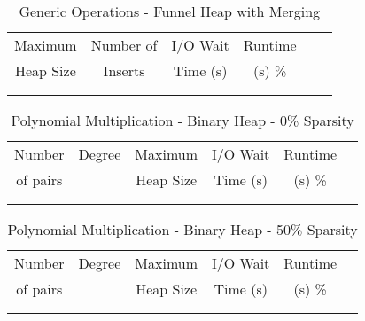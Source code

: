 \documentclass[11pt, one-sided]{amsart}
\begin{document}
\begin{table}[htbp]
   \centering
      \caption{Generic Operations - Funnel Heap with Merging}
   \begin{tabular}{|c|c|c|c|c|c|}
   	\hline
		 Maximum   	& 	Number of 	& I/O Wait		& Runtime 	 \\ 
		 Heap Size		&	Inserts	& Time (s)		&	(s)		 		\%		\\ \hline	
		 			&				&			&						\\
		 			&				&			&						\\
   \end{tabular}
   \label{tab:booktabs}
\end{table}


\newpage


\begin{table}[htbp]
   \centering
      \caption{Polynomial Multiplication - Binary Heap - 0\% Sparsity}
   \begin{tabular}{|c|c|c|c|c|c|}
   	\hline
		 Number   & 	Degree	& Maximum & I/O Wait		& Runtime 	 \\ 
		 of pairs 	&			& Heap Size	& Time (s)		&	(s)		 		\%				\\ \hline
		 		&			&			&			&						\\
		 		&			&			&			&						\\
   \end{tabular}
   \label{tab:booktabs}
\end{table}

\begin{table}[htbp]
   \centering
      \caption{Polynomial Multiplication - Binary Heap - 50\% Sparsity}
   \begin{tabular}{|c|c|c|c|c|c|}
   	\hline
		 Number   & 	Degree	& Maximum & I/O Wait		& Runtime 	 \\ 
		 of pairs 	&			& Heap Size	& Time (s)		&	(s)		 		\%				\\ \hline
		 		&			&			&			&						\\
		 		&			&			&			&						\\
   \end{tabular}
   \label{tab:booktabs}
\end{table}
\end{document}
